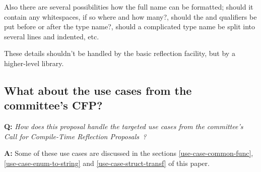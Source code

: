 Also there are several possibilities how the full name can be formatted;
should it contain any whitespaces, if so where and how many?, should the
\verb@const@ and \verb@volatile@ qualifiers be put before or after the type
name?, should a complicated type name be split into several lines and indented, etc.

These details shouldn't be handled by the basic reflection facility, but by
a higher-level library.

\subsection{What about the use cases from the committee's CFP?}

\textbf{Q:} {\em How does this proposal handle the targeted use cases
from the committee's Call for Compile-Time Reflection
Proposals~\cite{ISOCPP-N3814}?}

\textbf{A:} Some of these use cases are discussed in the sections
\ref{use-case-common-func}, \ref{use-case-enum-to-string}
and \ref{use-case-struct-transf} of this paper.

